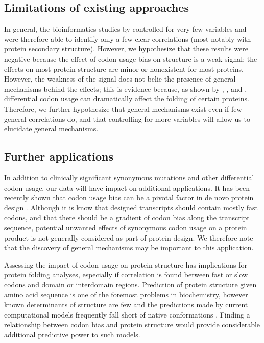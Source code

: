 \documentclass[11pt]{nih}
\begin{document}
\subsection{Limitations of existing approaches}

In general, the bioinformatics studies by \citet{Saunders2010,Biro2006,Adzhubei1996,Gu2003} controlled for very few variables and were therefore able to identify only a few clear correlations (most notably with protein secondary structure). However, we hypothesize that these results were negative because the effect of codon usage bias on structure is a weak signal: the effects on most protein structure are minor or nonexistent for most proteins. However, the weakness of the signal does not belie the presence of general mechanisms behind the effects; this is evidence because, as shown by \citet{Zhou2013}, \citet{Kimchi-Sarfaty2007}, and \citet{Crombie1994}, differential codon usage can dramatically affect the folding of certain proteins. Therefore, we further hypothesize that general mechanisms exist even if few general correlations do, and that controlling for more variables will allow us to elucidate general mechanisms.

\subsection{Further applications}
In addition to clinically significant synonymous mutations and other differential codon usage, our data will have impact on additional applications. It has been recently shown that codon usage bias can be a pivotal factor in de novo protein design \citep{gustafsson2004codon}. Although it is know that designed transcripts should contain mostly fast codons, and that there should be a gradient of codon bias along the transcript sequence, potential unwanted effects of synonymous codon usage on a protein product is not generally considered as part of protein design. We therefore note that the discovery of general mechanisms may be important to this application.

Assessing the impact of codon usage on protein structure has implications for protein folding analyses, especially if correlation is found between fast or slow codons and domain or interdomain regions. Prediction of protein structure given amino acid sequence is one of the foremost problems in biochemistry, however known determinants of structure are few \citep{bryngelson1995funnels} and the predictions made by current computational models frequently fall short of native conformations \citep{das2011four,shell2009blind}. Finding a relationship between codon bias and protein structure would provide considerable additional predictive power to such models.
\end{document}
